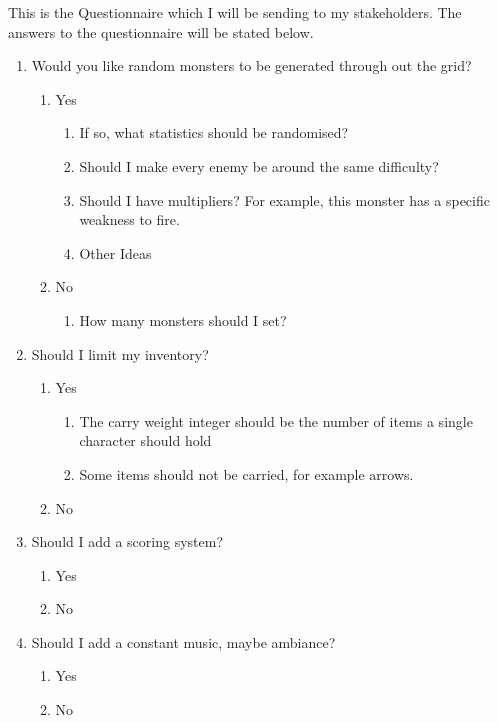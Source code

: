 \documentclass[12pt]{article}
\begin{document}
This is the Questionnaire which I will be sending to my stakeholders. The answers to the questionnaire will be stated below.

\begin{enumerate}
	\item{Would you like random monsters to be generated through out the grid?}
		\begin{enumerate}
		\item Yes
			\begin{enumerate}
				\item If so, what statistics should be randomised?
				\item Should I make every enemy be around the same difficulty?
				\item Should I have multipliers? For example, this monster has a specific weakness to fire.
				\item Other Ideas
			\end{enumerate}
		\item No
			\begin{enumerate}
				\item How many monsters should I set?
			\end{enumerate}
		\end{enumerate}


	\item{Should I limit my inventory?}
		\begin{enumerate}
		\item Yes
			\begin{enumerate}
				\item The carry weight integer should be the number of items a single character should hold
				\item Some items should not be carried, for example arrows.
			\end{enumerate}
		\item No
		\end{enumerate}

	\item{Should I add a scoring system?}
		\begin{enumerate}
		\item Yes
		\item No
		\end{enumerate}

	\item{Should I add a constant music, maybe ambiance?}
		\begin{enumerate}
		\item Yes
		\item No
		\end{enumerate}


\end{enumerate}
\end{document}
